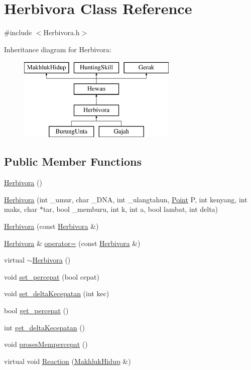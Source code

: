 \hypertarget{class_herbivora}{}\section{Herbivora Class Reference}
\label{class_herbivora}


{\ttfamily \#include $<$Herbivora.\+h$>$}

Inheritance diagram for Herbivora\+:\begin{figure}[H]
\begin{center}
\leavevmode
\includegraphics[height=4.000000cm]{class_herbivora}
\end{center}
\end{figure}
\subsection*{Public Member Functions}
\begin{DoxyCompactItemize}
\item 
\hyperlink{class_herbivora_ae8610577ee87a166177be431b989b2c0}{Herbivora} ()
\item 
\hyperlink{class_herbivora_a226a2efa9d41653fab8efa87608b583d}{Herbivora} (int \+\_\+umur, char \+\_\+\+D\+NA, int \+\_\+ulangtahun, \hyperlink{class_point}{Point} P, int kenyang, int maks, char $\ast$tar, bool \+\_\+memburu, int k, int a, bool lambat, int delta)
\item 
\hyperlink{class_herbivora_a754ef435d7a6a6bffe727e809e5f211b}{Herbivora} (const \hyperlink{class_herbivora}{Herbivora} \&)
\item 
\hyperlink{class_herbivora}{Herbivora} \& \hyperlink{class_herbivora_a045acf6e3df5988ca9e93384e5450876}{operator=} (const \hyperlink{class_herbivora}{Herbivora} \&)
\item 
virtual \hyperlink{class_herbivora_aa0dcb5298f0e99b7bcb1a335bdffa393}{$\sim$\+Herbivora} ()
\item 
void \hyperlink{class_herbivora_a1b460ec339813b44bd368412fd3b2c76}{set\+\_\+percepat} (bool cepat)
\item 
void \hyperlink{class_herbivora_a8cf1ea08fd33527b16e2092935080a3d}{set\+\_\+delta\+Kecepatan} (int kec)
\item 
bool \hyperlink{class_herbivora_acf023d22ffa5accee04a503ded9952a6}{get\+\_\+percepat} ()
\item 
int \hyperlink{class_herbivora_a60f1095412a18804afd582dbba89415b}{get\+\_\+delta\+Kecepatan} ()
\item 
void \hyperlink{class_herbivora_a8e90ec668b96032f698bf99569481f62}{proses\+Mempercepat} ()
\item 
virtual void \hyperlink{class_herbivora_a649b50a3d1e6f8d290baf1977a6ce88a}{Reaction} (\hyperlink{class_makhluk_hidup}{Makhluk\+Hidup} \&)
\end{DoxyCompactItemize}



